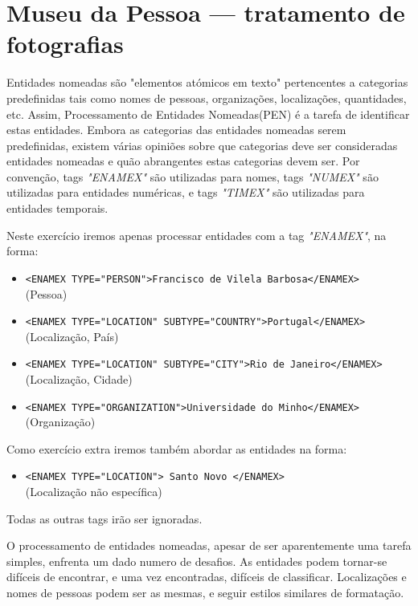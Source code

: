 \chapter{Museu da Pessoa — tratamento de fotografias}
\label{cap:enamex}

Entidades nomeadas são "elementos atómicos em texto" pertencentes a categorias predefinidas tais como nomes de pessoas, organizações, localizações, quantidades, etc. Assim, Processamento de Entidades Nomeadas(PEN) é a tarefa de identificar estas entidades.
Embora as categorias das entidades nomeadas serem predefinidas, existem várias opiniões sobre que categorias deve ser consideradas entidades nomeadas e quão abrangentes estas categorias devem ser. Por convenção, tags \emph{"ENAMEX"} são utilizadas para nomes, tags \emph{"NUMEX"} são utilizadas para entidades numéricas, e tags \emph{"TIMEX"} são utilizadas para entidades temporais.

Neste exercício iremos apenas processar entidades com a tag \emph{"ENAMEX"}, na forma:
\begin{itemize}
\item\verb!<ENAMEX TYPE="PERSON">Francisco de Vilela Barbosa</ENAMEX>!\\(Pessoa)
\item\verb!<ENAMEX TYPE="LOCATION" SUBTYPE="COUNTRY">Portugal</ENAMEX>!\\ (Localização, País)
\item\verb!<ENAMEX TYPE="LOCATION" SUBTYPE="CITY">Rio de Janeiro</ENAMEX>!\\  (Localização, Cidade)
\item\verb!<ENAMEX TYPE="ORGANIZATION">Universidade do Minho</ENAMEX>!\\(Organização)
\end{itemize}

Como exercício extra iremos também abordar as entidades na forma:
\begin{itemize}
\item\verb!<ENAMEX TYPE="LOCATION"> Santo Novo </ENAMEX>!\\(Localização não específica)
\end{itemize}
Todas as outras tags irão ser ignoradas.

O processamento de entidades nomeadas, apesar de ser aparentemente uma tarefa simples, enfrenta um dado numero de desafios. As entidades podem tornar-se difíceis de encontrar, e uma vez encontradas, difíceis de classificar. Localizações e nomes de pessoas podem ser as mesmas, e seguir estilos similares de formatação.

